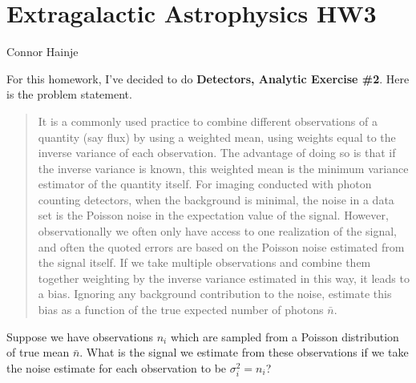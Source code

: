 \documentclass{article}
\begin{document}
{
	\centering
	\section*{Extragalactic Astrophysics HW3}
	Connor Hainje
	\vspace{2em}
	\par
}

For this homework, I've decided to do \textbf{Detectors, Analytic Exercise
\#2}. Here is the problem statement.

\begin{quote}
It is a commonly used practice to combine different observations of a quantity
(say flux) by using a weighted mean, using weights equal to the inverse
variance of each observation. The advantage of doing so is that if the inverse
variance is known, this weighted mean is the minimum variance estimator of the
quantity itself. For imaging conducted with photon counting detectors, when the
background is minimal, the noise in a data set is the Poisson noise in the
expectation value of the signal. However, observationally we often only have
access to one realization of the signal, and often the quoted errors are based
on the Poisson noise estimated from the signal itself. If we take multiple
observations and combine them together weighting by the inverse variance
estimated in this way, it leads to a bias. Ignoring any background contribution
to the noise, estimate this bias as a function of the true expected number of
photons $\bar n$.
\end{quote}



Suppose we have observations $n_i$ which are sampled from a Poisson
distribution of true mean $\bar n$. What is the signal we estimate from these
observations if we take the noise estimate for each observation to be
$\sigma_i^2 = n_i$?
\end{document}
